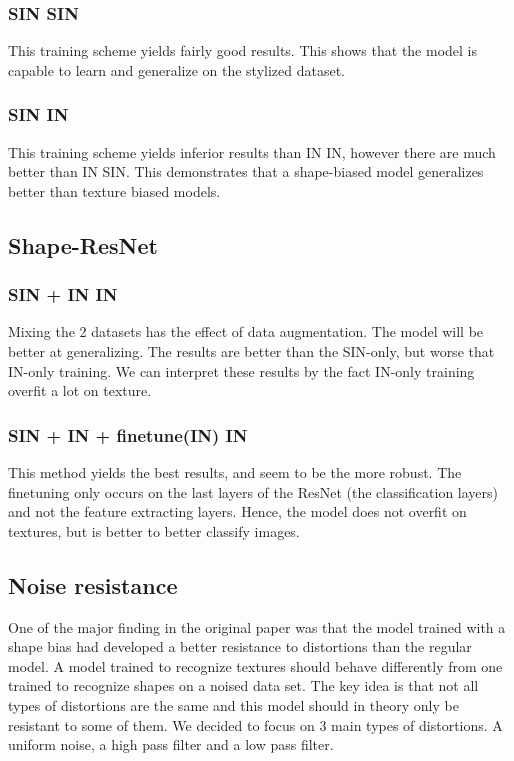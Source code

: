 \documentclass{article}
\begin{document}
\subsubsection{SIN \texorpdfstring{\textrightarrow} .SIN}
This training scheme yields fairly good results. This shows that the model is capable to learn
and generalize on the stylized dataset.

\subsubsection{SIN \texorpdfstring{\textrightarrow} .IN}

This training scheme yields inferior results than IN \texorpdfstring{\textrightarrow} IIN, however
there are much better than IN \texorpdfstring{\textrightarrow} .SIN.
This demonstrates that a shape-biased model generalizes better than texture biased models.

\subsection{Shape-ResNet}

\subsubsection{SIN + IN \texorpdfstring{\textrightarrow} .IN}

Mixing the 2 datasets has the effect of data augmentation. The model will be better
at generalizing. The results are better than the SIN-only, but worse that IN-only training.
We can interpret these results by the fact IN-only training overfit a lot on texture.

\subsubsection{SIN + IN + finetune(IN) \texorpdfstring{\textrightarrow} .IN}

This method yields the best results, and seem to be the more robust. The finetuning only occurs
on the last layers of the ResNet (the classification layers) and not the feature extracting layers.
Hence, the model does not overfit on textures, but is better to better classify images.

\subsection{Noise resistance}


One of the major finding in the original paper was that the model trained with a shape bias had developed a better resistance to distortions than the regular model.
A model trained to recognize textures should behave differently from one trained to recognize shapes on a noised data set.  The key idea is that not all types of distortions are the same and this model should in theory only be resistant to some of them.  We decided to focus on 3 main types of distortions.  A uniform noise, a high pass filter and a low pass filter.
\end{document}

